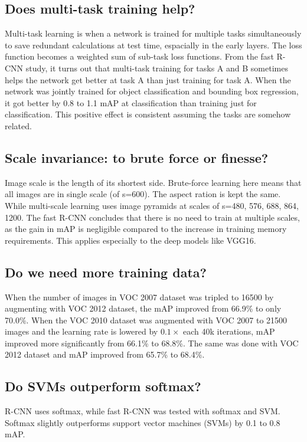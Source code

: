 \documentclass[10pt]{article}
\begin{document}
\subsection{Does multi-task training help?}
Multi-task learning is when a network is trained for multiple tasks simultaneously to save redundant calculations at test time, espacially in the early layers. The loss function becomes a weighted sum of sub-task loss functions. From the fast R-CNN study, it turns out that multi-task training for tasks A and B sometimes helps the network get better at task A than just training for task A. When the network was jointly trained for object classification and bounding box regression, it got better by 0.8 to 1.1 mAP at classification than training just for classification. This positive effect is consistent assuming the tasks are somehow related.

\subsection{Scale invariance: to brute force or finesse?}
Image scale is the length of its shortest side. Brute-force learning here means that all images are in single scale (of s=600). The aspect ration is kept the same. While multi-scale learning uses image pyramids at scales of s={480, 576, 688, 864, 1200}. The fast R-CNN concludes that there is no need to train at multiple scales, as the gain in mAP is negligible compared to the increase in training memory requirements. This applies especially to the deep models like VGG16.

\subsection{Do we need more training data?}
When the number of images in VOC 2007 dataset was tripled to 16500 by augmenting with VOC 2012 dataset, the mAP improved from 66.9\% to only 70.0\%. When the VOC 2010 dataset was augmented with VOC 2007 to 21500 images and the learning rate is lowered by $0.1\times$ each 40k iterations, mAP improved more significantly from 66.1\% to 68.8\%. The same was done with VOC 2012 dataset and mAP improved from 65.7\% to 68.4\%.

\subsection{Do SVMs outperform softmax?}
R-CNN uses softmax, while fast R-CNN was tested with softmax and SVM. Softmax slightly outperforms support vector machines (SVMs) by 0.1 to 0.8 mAP.
\end{document}
